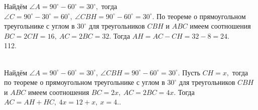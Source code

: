 \documentclass[12pt]{article}
\begin{document}
Найдём $\angle A=90^\circ-60^\circ=30^\circ,$ тогда $\angle C=90^\circ-30^\circ=60^\circ,\ \angle CBH=90^\circ-60^\circ=30^\circ.$ По теореме о прямоугольном треугольнике с углом в $30^\circ$ для треугольников $CBH$ и $ABC$ имеем соотношения $BC=2CH=16,\ AC=2BC=32.$ Тогда $AH=AC-CH=32-8=24.$\\
112. \begin{figure}[ht!]
\end{figure}\\
Найдём $\angle A=90^\circ-60^\circ=30^\circ,\ \angle CBH=90^\circ-60^\circ=30^\circ.$ Пусть $CH=x,$ тогда по теореме о прямоугольном треугольнике с углом в $30^\circ$ для треугольников $CBH$ и $ABC$ имеем соотношения $BC=2x,\ AC=2BC=4x.$ Тогда $AC=AH+HC,\ 4x=12+x,\ x=4.$\newpage{}. \begin{figure}[ht!]
\end{figure}\\
\end{document}
